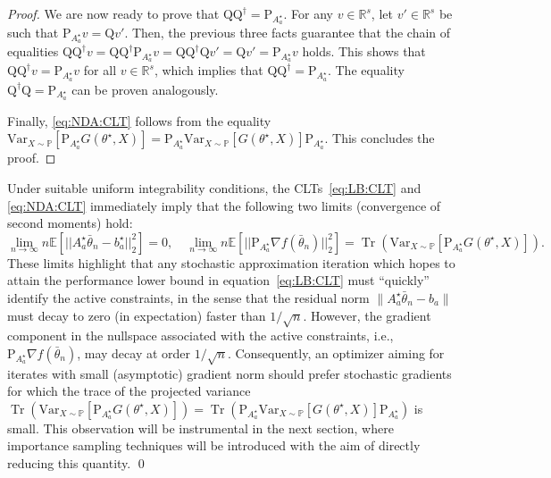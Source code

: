 \documentclass[11pt,a4paper]{article}
\theoremstyle{definition}
\DeclareMathOperator*{\trace}{Tr}
\begin{document}
\begin{proof}
We are now ready to prove that $\text{Q}\text{Q}^\dagger = \text{P}_{A^\star_{a}}$. For any $v \in \mathbb R^s$, let $v'  \in \mathbb R^s$ be such that $\text{P}_{A^\star_a} v = \text{Q} v'$. Then, the previous three facts guarantee that the chain of equalities $\text{Q} \text{Q}^{\dagger} v = \text{Q} \text{Q}^{\dagger} \text{P}_{A^\star_a} v = \text{Q} \text{Q}^{\dagger} \text{Q} v' = \text{Q} v' = \text{P}_{A^\star_a}v$ holds. This shows that $\text{Q} \text{Q}^{\dagger} v = \text{P}_{A^\star_{a}} v$ for all $v \in \mathbb R^s$, which implies that $\text{Q}\text{Q}^\dagger = \text{P}_{A^\star_{a}}$. The equality $\text{Q}^\dagger\text{Q} = \text{P}_{A^\star_{a}}$ can be proven analogously. 

Finally, \eqref{eq:NDA:CLT} follows from the equality $\text{Var}_{X \sim \mathbb P}\left[\text{P}_{A^\star_{a}} G(\theta^\star,X) \right] = \text{P}_{A^\star_{a}} \text{Var}_{X \sim \mathbb P}\left[G(\theta^\star,X) \right] \text{P}_{A^\star_{a}}$. This concludes the proof.
\end{proof}

Under suitable uniform integrability conditions, the CLTs~\eqref{eq:LB:CLT} and \eqref{eq:NDA:CLT} immediately imply that the following two limits (convergence of second moments) hold:
\begin{equation}
\label{eq:trace-identity}
    \lim_{n\to\infty} n \mathbb E \left[ ||A^\star_a\bar\theta_n-b^\star_a||_2^2 \right]=0, \quad \lim_{n\to\infty} n \mathbb E \left[ ||\text{P}_{A^\star_{a}} \nabla f(\bar \theta_n)||_2^2 \right] = \trace\left( \text{Var}_{X \sim \mathbb P}\left[\text{P}_{A^\star_{a}} G(\theta^\star,X)\right] \right).
\end{equation}
These limits highlight that any stochastic approximation iteration which hopes to attain the performance lower bound in equation~\eqref{eq:LB:CLT} must ``quickly'' identify the active constraints, in the sense that the residual norm $\|A^\star_a\bar\theta_n-b_a\|$ must decay to zero (in expectation) faster than $1/\sqrt{n}$. However, the gradient component in the nullspace associated with the active constraints, i.e., $\text{P}_{A^\star_{a}} \nabla {f}(\bar{\theta}_n)$, may decay at order $1/\sqrt{n}$. Consequently, an optimizer aiming for iterates with small (asymptotic) gradient norm should prefer stochastic gradients for which the trace of the projected variance $\trace\left(\text{Var}_{X \sim \mathbb P}\left[\text{P}_{A^\star_{a}} G(\theta^\star,X)\right]\right)=\trace\left(\text{P}_{A^\star_{a}} \text{Var}_{X \sim \mathbb P}\left[G(\theta^\star,X)\right] \text{P}_{A^\star_{a}}\right)$ is small. This observation will be instrumental in the next section, where importance sampling techniques will be introduced with the aim of directly reducing this quantity. \qed
\end{document}
